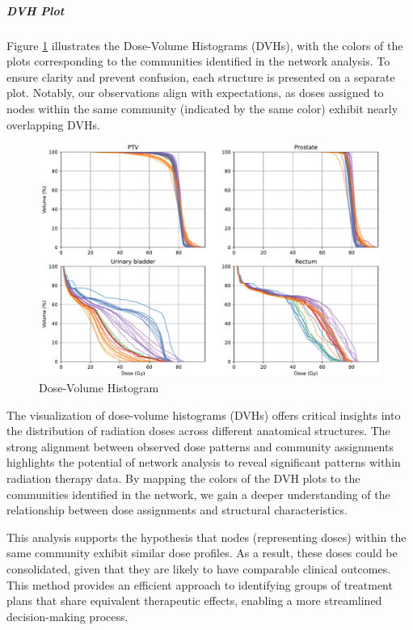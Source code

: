 \subparagraph{DVH Plot}
Figure \ref{fig:dvh} illustrates the Dose-Volume Histograms (DVHs), with the colors of the plots corresponding to the communities identified in the network analysis.
To ensure clarity and prevent confusion, each structure is presented on a separate plot.
Notably, our observations align with expectations, as doses assigned to nodes within the same community (indicated by the same color) exhibit nearly overlapping DVHs.
\begin{figure}
	\centering
	\includegraphics[width=\textwidth]{dose_clustering_figures/dvh.pdf}
	\caption{Dose-Volume Histogram}
	\label{fig:dvh}
\end{figure}

The visualization of dose-volume histograms (DVHs) offers critical insights into the distribution of radiation doses across different anatomical structures.
The strong alignment between observed dose patterns and community assignments highlights the potential of network analysis to reveal significant patterns within radiation therapy data.
By mapping the colors of the DVH plots to the communities identified in the network, we gain a deeper understanding of the relationship between dose assignments and structural characteristics.

This analysis supports the hypothesis that nodes (representing doses) within the same community exhibit similar dose profiles.
As a result, these doses could be consolidated, given that they are likely to have comparable clinical outcomes.
This method provides an efficient approach to identifying groups of treatment plans that share equivalent therapeutic effects, enabling a more streamlined decision-making process.


